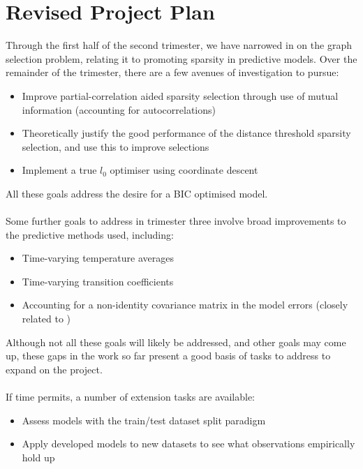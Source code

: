 \documentclass[12pt,a4paper]{article} %
\begin{document}
\newpage
\section{Revised Project Plan}
Through the first half of the second trimester, we have narrowed in on the graph selection problem, relating it to promoting sparsity in predictive models. Over the remainder of the trimester, there are a few avenues of investigation to pursue:
\begin{itemize}
    \item Improve partial-correlation aided sparsity selection through use of mutual information (accounting for autocorrelations)
    \item Theoretically justify the good performance of the distance threshold sparsity selection, and use this to improve selections
    \item Implement a true $l_0$ optimiser using coordinate descent
\end{itemize}
All these goals address the desire for a BIC optimised model.\\\\
Some further goals to address in trimester three involve broad improvements to the predictive methods used, including:
\begin{itemize}
    \item Time-varying temperature averages
    \item Time-varying transition coefficients
    \item Accounting for a non-identity covariance matrix in the model errors (closely related to \cite{glasso})
\end{itemize}
Although not all these goals will likely be addressed, and other goals may come up, these gaps in the work so far present a good basis of tasks to address to expand on the project.\\\\
If time permits, a number of extension tasks are available:
\begin{itemize}
    \item Assess models with the train/test dataset split paradigm
    \item Apply developed models to new datasets to see what observations empirically hold up
\end{itemize}
\end{document}
